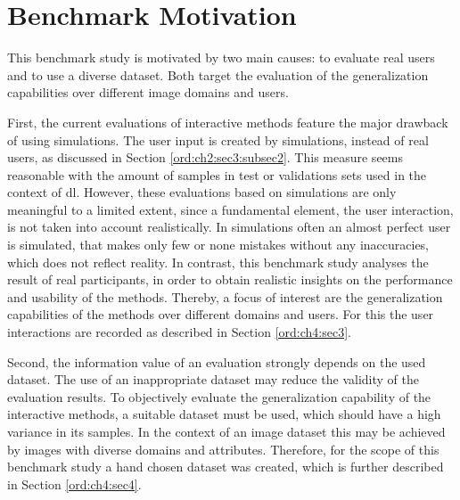 
\section{Benchmark Motivation}\label{ord:ch4:sec1}

This benchmark study is motivated by two main causes: to evaluate real users and to use a diverse dataset.
Both target the evaluation of the generalization capabilities over different image domains and users.

First, the current evaluations of interactive methods feature the major drawback of using simulations.
The user input is created by simulations, instead of real users, as discussed in Section \ref{ord:ch2:sec3:subsec2}.
This measure seems reasonable with the amount of samples in test or validations sets used in the context of \gls{dl}.
However, these evaluations based on simulations are only meaningful to a limited extent, since a fundamental element, the user interaction, is not taken into account realistically.
In simulations often an almost perfect user is simulated, that makes only few or none mistakes without any inaccuracies, which does not reflect reality.
In contrast, this benchmark study analyses the result of real participants, in order to obtain realistic insights on the performance and usability of the methods.
Thereby, a focus of interest are the generalization capabilities of the methods over different domains and users. 
For this the user interactions are recorded as described in Section \ref{ord:ch4:sec3}.

Second, the information value of an evaluation strongly depends on the used dataset.
The use of an inappropriate dataset may reduce the validity of the evaluation results.
To objectively evaluate the generalization capability of the interactive methods, a suitable dataset must be used, which should have a high variance in its samples.
In the context of an image dataset this may be achieved by images with diverse domains and attributes.
Therefore, for the scope of this benchmark study a hand chosen dataset was created, which is further described in Section \ref{ord:ch4:sec4}.
